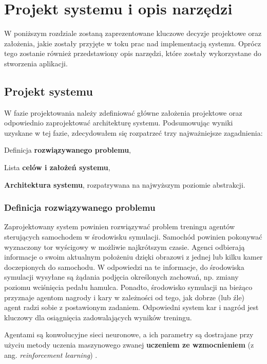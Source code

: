 \chapter{Projekt systemu i opis narzędzi}
\label{DesignSystemChapter}
W poniższym rozdziale zostaną zaprezentowane kluczowe decyzje projektowe oraz założenia, jakie zostały przyjęte w toku prac nad implementacją systemu. Oprócz tego zostanie również przedstawiony opis narzędzi, które zostały wykorzystane do stworzenia aplikacji.

\section{Projekt systemu}
W fazie projektowania należy zdefiniować główne założenia projektowe oraz odpowiednio zaprojektować architekturę systemu. Podsumowując wyniki uzyskane w tej fazie, zdecydowałem się rozpatrzeć trzy najważniejsze zagadnienia:
\begin{enumerate*}
\item Definicja \textbf{rozwiązywanego problemu},
\item Lista \textbf{celów i założeń systemu},
\item \textbf{Architektura systemu}, rozpatrywana na najwyższym poziomie abstrakcji.
\end{enumerate*}

\subsection{Definicja rozwiązywanego problemu}
Zaprojektowany system powinien rozwiązywać problem treningu agentów sterujących samochodem w środowisku symulacji. Samochód powinien pokonywać wyznaczony tor wyścigowy w możliwie najkrótszym czasie. Agenci odbierają informacje o swoim aktualnym położeniu dzięki obrazowi z jednej lub kilku kamer doczepionych do samochodu. W odpowiedzi na te informacje, do środowiska symulacji wysyłane są żądania podjęcia określonych zachowań, np. zmiany poziomu wciśnięcia pedału hamulca. Ponadto, środowisko symulacji na bieżąco przyznaje agentom nagrody i kary w zależności od tego, jak dobrze (lub źle) agent radzi sobie z postawionym zadaniem. Odpowiedni system kar i nagród jest kluczowy dla osiągnięcia zadowalających wyników treningu.

Agentami są konwolucyjne sieci neuronowe, a ich parametry są dostrajane przy użyciu metody uczenia maszynowego zwanej \textbf{uczeniem ze wzmocnieniem} (z ang. \textit{reinforcement learning}) \cite{deepRL:guide}.

